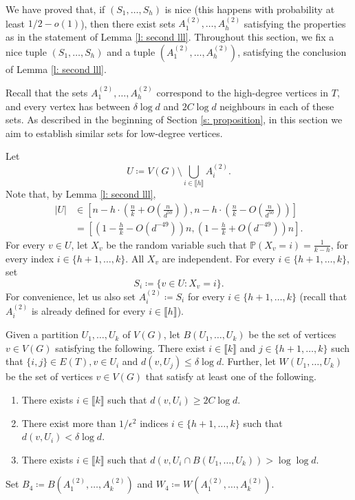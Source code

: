 \documentclass[notitlepage]{scrartcl}
\newcommand{\br}[1]{\llbracket{#1}\rrbracket}
\begin{document}
We have proved that, if $(S_1,\ldots,S_h)$ is nice (this happens with probability at least $1/2-o(1)$), then there exist sets $A_1^{(2)},\ldots, A_h^{(2)}$ satisfying the properties as in the statement of Lemma \ref{l: second lll}.
Throughout this section, we fix a nice tuple $(S_1,\ldots,S_h)$ and a tuple $(A_1^{(2)},\ldots,A_h^{(2)})$, satisfying the conclusion of Lemma \ref{l: second lll}.




Recall that the sets $A_1^{(2)},\ldots, A_h^{(2)}$ correspond to the high-degree vertices in $T$, and every vertex has between $\delta\log d$ and $2C\log d$ neighbours in each of these sets. As described in the beginning of Section \ref{s: proposition}, in this section we aim to establish similar sets for low-degree vertices.

Let 
\begin{equation}
    U\coloneqq V(G)\setminus \bigcup_{i \in \br{h}} A_i^{(2)}.
    \label{eq:U-def}
\end{equation}
    Note that, by Lemma \ref{l: second lll},
\begin{align}
  |U|&\in \left[n-h\cdot\left(\frac{n}{k}+O\left(\frac{n}{d^{50}}\right)\right), n-h\cdot\left(\frac{n}{k}-O\left(\frac{n}{d^{50}}\right)\right)\right]\nonumber\\
  &=\left[\left(1-\frac{h}{k}-O(d^{-49})\right)n, \left(1-\frac{h}{k}+O(d^{-49})\right)n\right]. \label{eq: size y}
\end{align}
For every $v \in U$, let $X_v$ be the random variable such that $\mathbb{P}\left(X_v=i\right)=\frac{1}{k-h}$, for every index $i\in\{h+1,\ldots,k\}$. All $X_v$ are independent. For every $i\in\{h+1,\ldots,k\}$, set 
\[
    S_i \coloneqq \{v \in U \colon X_v = i\}.
\]
For convenience, let us also set $A_i^{(2)}\coloneqq S_i$ for every $i\in \{h+1,\ldots,k\}$ (recall that $A_i^{(2)}$ is already defined for every $i\in \br{h}$).


Given a partition $U_1,\ldots, U_k$ of $V(G)$, let $B(U_1,\ldots, U_k)$ be the set of vertices $v\in V(G)$ satisfying the following. There exist $i\in \br{k}$ and $j\in \{h+1,\ldots, k\}$ such that $\{i,j\}\in E(T), v\in U_i$ and $d(v,U_j)\le \delta \log d$. Further, let $W(U_1,\ldots, U_k)$ be the set of vertices $v\in V(G)$ that satisfy at least one of the following.
\begin{enumerate}
    \item There exists $i \in \br{k}$ such that $d(v, U_i )\ge 2C \log d$.
    \item There exist more than $1 / \epsilon^2$ indices $i \in \{h+1,\ldots,k\}$ such that $d(v, U_i) < \delta \log d$.
    \item There exists $i \in \br{k}$ such that $d\left(v, U_i \cap B(U_1,\ldots,U_k)\right) > \log \log d$.    
\end{enumerate}
Set $B_4\coloneqq B(A_1^{(2)},\ldots, A_k^{(2)})$ and $W_4\coloneqq W(A_1^{(2)},\ldots, A_k^{(2)})$.
\end{document}
